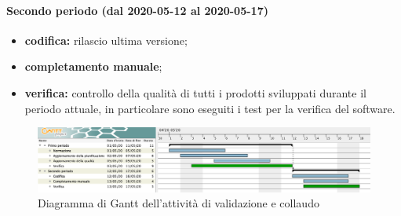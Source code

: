 				\paragraph{Secondo periodo (dal 2020-05-12 al 2020-05-17)}
				
					\begin{itemize}
						\item \textbf{codifica:} rilascio ultima versione;
						\item \textbf{completamento manuale};
						\item \textbf{verifica:} controllo della qualità di tutti i prodotti sviluppati durante il periodo attuale, in particolare sono eseguiti i test per la verifica del software.
					\end{itemize}

			
		\begin{landscape}

          \begin{figure}[H]
            \centering
            \includegraphics[width=\linewidth]{images/gantt/validazioneCollaudo}
            \caption{Diagramma di Gantt dell'attività di validazione e collaudo}
          \end{figure}

		\end{landscape}
